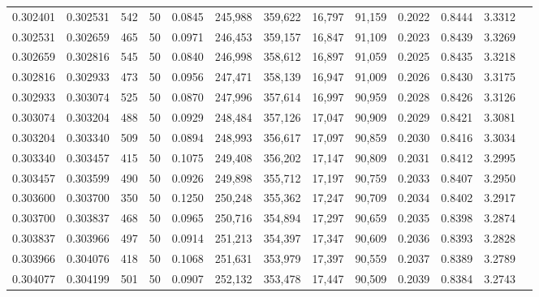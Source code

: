 \begin{tabular}{rrrrrrrrrrrrr}
0.302401 & 0.302531 &   542 &  50 &                                     0.0845 & 245,988 & 359,622 &  16,797 &  91,159 & 0.2022 & 0.8444 & 3.3312 \\
0.302531 & 0.302659 &   465 &  50 &                                     0.0971 & 246,453 & 359,157 &  16,847 &  91,109 & 0.2023 & 0.8439 & 3.3269 \\
0.302659 & 0.302816 &   545 &  50 &                                     0.0840 & 246,998 & 358,612 &  16,897 &  91,059 & 0.2025 & 0.8435 & 3.3218 \\
0.302816 & 0.302933 &   473 &  50 &                                     0.0956 & 247,471 & 358,139 &  16,947 &  91,009 & 0.2026 & 0.8430 & 3.3175 \\
0.302933 & 0.303074 &   525 &  50 &                                     0.0870 & 247,996 & 357,614 &  16,997 &  90,959 & 0.2028 & 0.8426 & 3.3126 \\
0.303074 & 0.303204 &   488 &  50 &                                     0.0929 & 248,484 & 357,126 &  17,047 &  90,909 & 0.2029 & 0.8421 & 3.3081 \\
0.303204 & 0.303340 &   509 &  50 &                                     0.0894 & 248,993 & 356,617 &  17,097 &  90,859 & 0.2030 & 0.8416 & 3.3034 \\
0.303340 & 0.303457 &   415 &  50 &                                     0.1075 & 249,408 & 356,202 &  17,147 &  90,809 & 0.2031 & 0.8412 & 3.2995 \\
0.303457 & 0.303599 &   490 &  50 &                                     0.0926 & 249,898 & 355,712 &  17,197 &  90,759 & 0.2033 & 0.8407 & 3.2950 \\
0.303600 & 0.303700 &   350 &  50 &                                     0.1250 & 250,248 & 355,362 &  17,247 &  90,709 & 0.2034 & 0.8402 & 3.2917 \\
0.303700 & 0.303837 &   468 &  50 &                                     0.0965 & 250,716 & 354,894 &  17,297 &  90,659 & 0.2035 & 0.8398 & 3.2874 \\
0.303837 & 0.303966 &   497 &  50 &                                     0.0914 & 251,213 & 354,397 &  17,347 &  90,609 & 0.2036 & 0.8393 & 3.2828 \\
0.303966 & 0.304076 &   418 &  50 &                                     0.1068 & 251,631 & 353,979 &  17,397 &  90,559 & 0.2037 & 0.8389 & 3.2789 \\
0.304077 & 0.304199 &   501 &  50 &                                     0.0907 & 252,132 & 353,478 &  17,447 &  90,509 & 0.2039 & 0.8384 & 3.2743 \\

\end{tabular}
